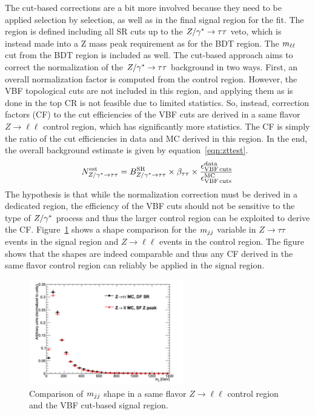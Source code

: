 The cut-based corrections are a bit more involved because they need to be applied selection by selection, as well as in the final signal region for the fit. The region is defined including all SR cuts up to the $Z/\gamma^{\ast} \to \tau\tau$ veto, which is instead made into a Z mass peak requirement as for the BDT region. The $m_{\ell\ell}$ cut from the BDT region is included as well. The cut-based approach aims to correct the normalization of the $Z/\gamma^{\ast} \to\tau\tau$ background in two ways. First, an overall normalization factor is computed from the control region. However, the VBF topological cuts are not included in this region, and applying them as is done in the top CR is not feasible due to limited statistics. So, instead, correction factors (CF) to the cut efficiencies of the VBF cuts are derived in a same flavor $Z\to\ell\ell$ control region, which has significantly more statistics. The CF is simply the ratio of the cut efficiencies in data and MC derived in this region. In the end, the overall background estimate is given by equation~\ref{eqn:zttest}.
%
\begin{equation}
N^{\rm est}_{Z/\gamma^{\ast} \to \tau\tau} = B^{\rm SR}_{Z/\gamma^{\ast} \to \tau\tau} \times \beta_{\tau\tau} \times \frac{\epsilon_{\rm VBF\,cuts}^{\rm data}}{\epsilon_{\rm VBF\,cuts}^{\rm MC}} 
\label{eqn:zttest}
\end{equation}
%
The hypothesis is that while the normalization correction must be derived in a dedicated region, the efficiency of the VBF cuts should not be sensitive to the type of $Z/\gamma^{\ast}$ process and thus the larger control region can be exploited to derive the CF. Figure~\ref{fig:vbf_ztt_comp} shows a shape comparison for the $m_{jj}$ variable in $Z\to\tau\tau$ events in the signal region and $Z\to\ell\ell$ events in the control region. The figure shows that the shapes are indeed comparable and thus any CF derived in the same flavor control region can reliably be applied in the signal region. 

\begin{figure}[h!]
  \centering
  \captionsetup{justification=centering}
  \includegraphics[width=0.6\textwidth]{figures/VBF_DYtt_shape_comp}
  \caption{Comparison of $m_{jj}$ shape in a same flavor $Z\to\ell\ell$ control region and the VBF cut-based signal region.}
  \label{fig:vbf_ztt_comp}
\end{figure}

